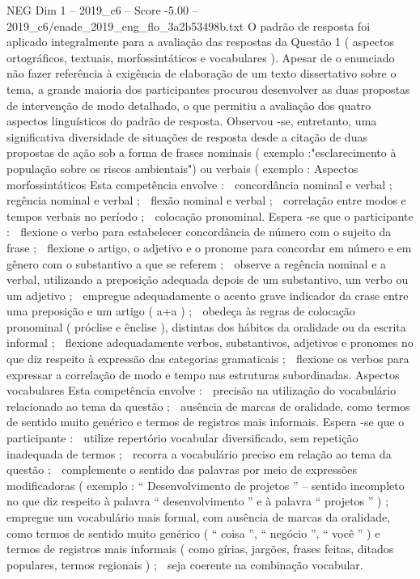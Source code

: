 \begin{textsample}{NEG Dim 1 – 2019\_c6 – Score -5.00 – 2019\_c6/enade\_2019\_eng\_flo\_3a2b53498b.txt}
O padrão de resposta foi aplicado integralmente para a avaliação das respostas da Questão 1 ( aspectos ortográficos, textuais, morfossintáticos e vocabulares ).
Apesar de o enunciado não fazer referência à exigência de elaboração de um texto dissertativo sobre o tema, a grande maioria dos participantes procurou desenvolver as duas propostas de intervenção de modo detalhado, o que permitiu a avaliação dos quatro aspectos linguísticos do padrão de resposta.
Observou -se, entretanto, uma significativa diversidade de situações de resposta desde a citação de duas propostas de ação sob a forma de frases nominais ( exemplo :"esclarecimento à população sobre os riscos ambientais") ou verbais ( exemplo : Aspectos morfossintáticos Esta competência envolve :  concordância nominal e verbal ;  regência nominal e verbal ;  flexão nominal e verbal ;  correlação entre modos e tempos verbais no período ;  colocação pronominal.
Espera -se que o participante :  flexione o verbo para estabelecer concordância de número com o sujeito da frase ;  flexione o artigo, o adjetivo e o pronome para concordar em número e em gênero com o substantivo a que se referem ;  observe a regência nominal e a verbal, utilizando a preposição adequada depois de um substantivo, um verbo ou um adjetivo ;  empregue adequadamente o acento grave indicador da crase entre uma preposição e um artigo ( a+a ) ;  obedeça às regras de colocação pronominal ( próclise e ênclise ), distintas dos hábitos da oralidade ou da escrita informal ;  flexione adequadamente verbos, substantivos, adjetivos e pronomes no que diz respeito à expressão das categorias gramaticais ;  flexione os verbos para expressar a correlação de modo e tempo nas estruturas subordinadas.
Aspectos vocabulares Esta competência envolve :  precisão na utilização do vocabulário relacionado ao tema da questão ;  ausência de marcas de oralidade, como termos de sentido muito genérico e termos de registros mais informais.
Espera -se que o participante :  utilize repertório vocabular diversificado, sem repetição inadequada de termos ;  recorra a vocabulário preciso em relação ao tema da questão ;  complemente o sentido das palavras por meio de expressões modificadoras ( exemplo : “ Desenvolvimento de projetos ” – sentido incompleto no que diz respeito à palavra “ desenvolvimento ” e à palavra “ projetos ” ) ;  empregue um vocabulário mais formal, com ausência de marcas da oralidade, como termos de sentido muito genérico ( “ coisa ”, “ negócio ”, “ você ” ) e termos de registros mais informais ( como gírias, jargões, frases feitas, ditados populares, termos regionais ) ;  seja coerente na combinação vocabular.

\end{textsample}
